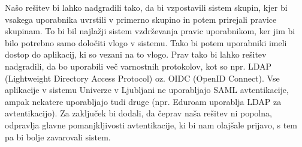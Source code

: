 \documentclass[a4paper,12pt,openright,oneside]{book}
\begin{document}
\newline
Našo rešitev bi lahko nadgradili tako, da bi vzpostavili sistem skupin, kjer bi vsakega uporabnika uvrstili v primerno skupino in potem prirejali pravice skupinam. To bi bil najlažji sistem vzdrževanja pravic uporabnikom, ker jim bi bilo potrebno samo določiti vlogo v sistemu. Tako bi potem uporabniki imeli dostop do aplikacij, ki so vezani na to vlogo. 
\newline
Prav tako bi lahko rešitev nadgradili, da bo uporabili več varnostnih protokolov, kot so npr. LDAP (Lightweight Directory Access Protocol) oz. OIDC (OpenID Connect). Vse aplikacije v sistemu Univerze v Ljubljani ne uporabljajo SAML avtentikacije, ampak nekatere uporabljajo tudi druge (npr. Eduroam uporablja LDAP za avtentikacijo). 
\newline
Za zaključek bi dodali, da čeprav naša rešitev ni popolna, odpravlja glavne pomanjkljivosti avtentikacije, ki bi nam olajšale prijavo, s tem pa bi bolje zavarovali sistem. 



\cleardoublepage

\printbibliography[heading=bibintoc,type=article,title={Članki v revijah}]

\printbibliography[heading=bibintoc,type=inproceedings,title={Članki v zbornikih}]

\printbibliography[heading=bibintoc,type=incollection,title={Poglavja v knjigah}]

\printbibliography[heading=bibintoc,title={Celotna literatura}]
\end{document}
